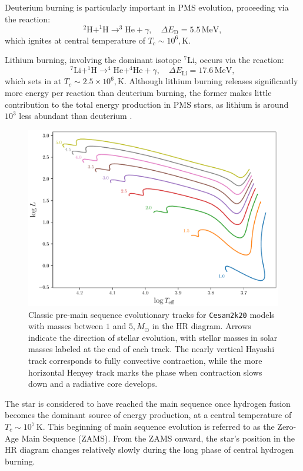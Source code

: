 \documentclass[12pt,a4paper]{article}
\newcommand{\mr}{\mathrm}
\begin{document}
Deuterium burning is particularly important in PMS evolution, proceeding via the reaction:
\begin{equation}
  ^2\mr{H} + ^1\mr{H} \rightarrow ^3\mr{He} + \gamma,\quad \Delta E_\mr{D} = 5.5\,\mr{MeV},
\end{equation}
which ignites at central temperature of $T_c \sim 10^6,\mr{K}$. 

Lithium burning, involving the dominant isotope $^7$Li, occurs via the reaction:
\begin{equation}
  ^7\mr{Li} + ^1\mr{H} \rightarrow ^4\mr{He} + ^4\mr{He} + \gamma,\quad \Delta E_\mr{Li} = 17.6\,\mr{MeV},
\end{equation}
which sets in at $T_c \sim 2.5 \times 10^6,\mr{K}$. Although lithium burning releases significantly more energy per reaction than deuterium burning, the former makes little contribution to the total energy production in PMS stars, as lithium is around $10^3$ less abundant than deuterium \parencite{GrevesseSauval1998}.

\begin{figure}[htbp]
  \centering
  \includegraphics[width=.75\textwidth]{classic_pms.pdf}
  \caption{Classic pre-main sequence evolutionary tracks for \texttt{Cesam2k20} models with masses between $1$ and $5,M_\odot$ in the HR diagram. Arrows indicate the direction of stellar evolution, with stellar masses in solar masses labeled at the end of each track. The nearly vertical Hayashi track corresponds to fully convective contraction, while the more horizontal Henyey track marks the phase when contraction slows down and a radiative core develops.} \label{fig:hayashi_henyey_tracks}
\end{figure}

The star is considered to have reached the main sequence once hydrogen fusion becomes the dominant source of energy production, at a central temperature of $T_c \sim 10^7\,\mr{K}$. This beginning of main sequence evolution is referred to as the Zero-Age Main Sequence (ZAMS). From the ZAMS onward, the star's position in the HR diagram changes relatively slowly during the long phase of central hydrogen burning.
\end{document}
